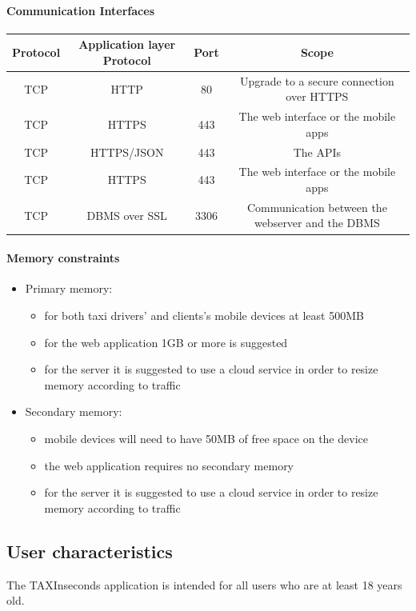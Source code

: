 \documentclass{article}
\begin{document}
\paragraph{Communication Interfaces}
\begin{center}
	\begin{tabular}{*{4}{c}}
	\toprule
    Protocol & Application layer Protocol & Port & Scope \\
	\midrule
	TCP & HTTP & 80 & Upgrade to a secure connection over HTTPS \\ 
    TCP & HTTPS & 443 & The web interface or the mobile apps \\ 
    TCP & HTTPS/JSON & 443 & The APIs \\ 
    TCP & HTTPS & 443 & The web interface or the mobile apps \\ 
    TCP & DBMS over SSL & 3306 & Communication between the webserver and the DBMS \\ 
    \bottomrule
    \end{tabular}
\end{center}
\paragraph{Memory constraints} 
\begin{itemize}
	\item Primary memory:
		\begin{itemize}
			\item for both taxi drivers' and clients's mobile devices at least 500MB 
			\item for the web application 1GB or more is suggested
			\item for the server it is suggested to use a cloud service in order to resize memory according to traffic
		\end{itemize}
	\item Secondary memory:
		\begin{itemize}
			\item mobile devices will need to have 50MB of free space on the device
			\item the web application requires no secondary memory 
			\item for the server it is suggested to use a cloud service in order to resize memory according to traffic
		\end{itemize}
\end{itemize}
\subsection{User characteristics}
The TAXInseconds application is intended for all users who are at least 18 years old. %
\end{document}
